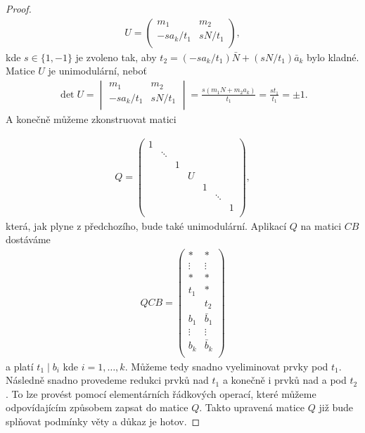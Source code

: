 \begin{proof}
\begin{align*}
U =
    \begin{pmatrix}
        m_1         & m_2      \\
        -sa_k / t_1 & sN / t_1 \\
    \end{pmatrix}
,
\end{align*}
kde $ s \in \{1, -1\} $ je zvoleno tak, aby
$ t_2 = (-sa_k / t_1) \bar{N} + (sN / t_1) \bar{a}_k $ bylo kladné. Matice $ U $
je unimodulární, neboť
\begin{align*}
\det U =
    \begin{vmatrix}
        m_1         & m_2      \\
        -sa_k / t_1 & sN / t_1 \\
    \end{vmatrix}
    = \frac{s(m_1 N + m_2 a_k)}{t_1} = \frac{s t_1}{t_1} = \pm 1
.
\end{align*}
A konečně můžeme zkonstruovat matici

\begin{align*}
Q =
    \begin{pmatrix}
        1 &        &   &   &   &        &   \\
          & \ddots &   &   &   &        &   \\
          &        & 1 &   &   &        &   \\
          &        &   & U &   &        &   \\
          &        &   &   & 1 &        &   \\
          &        &   &   &   & \ddots &   \\
          &        &   &   &   &        & 1 \\
    \end{pmatrix}
,
\end{align*}
která, jak plyne z předchozího, bude také unimodulární. Aplikací $ Q $ na matici
$ CB $ dostáváme
\begin{align*}
QCB =
    \begin{pmatrix}
        \ast   & \ast      \\
        \vdots & \vdots    \\
        \ast   & \ast      \\
        t_1    & \ast      \\
               & t_2       \\
        b_1    & \bar{b}_1 \\
        \vdots & \vdots    \\
        b_k    & \bar{b}_k \\
    \end{pmatrix}
\end{align*}
a platí $ t_1 \mid b_i$ kde $ i = 1, \dots, k $. Můžeme tedy snadno vyeliminovat
prvky pod $ t_1 $. Následně snadno provedeme redukci prvků nad $ t_1 $ a
konečně i prvků nad a pod $ t_2 $. To lze provést pomocí elementárních řádkových
operací, které můžeme odpovídajícím způsobem zapsat do matice $ Q $. Takto
upravená matice $ Q $ již bude splňovat podmínky věty a důkaz je hotov.

\end{proof}





